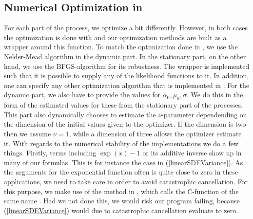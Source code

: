\subsection{Numerical Optimization in }
For each part of the process, we optimize a bit differently. However, in both cases the optimization is done with  \cite{Rlang} and our optimization methods are built as a wrapper around this function. To match the optimization done in \cite{Ditlevsen2023}, we use the Nelder-Mead algorithm in the dynamic part. In the stationary part, on the other hand, we use the BFGS-algorithm for its robustness. The wrapper is implemented such that it is possible to supply any of the likelihood functions to it. In addition, one can specify any other optimization algorithm that is implemented in . For the dynamic part, we also have to provide the values for $\alpha_0, \mu_0, \sigma$. We do this in the form of the estimated values for these from the stationary part of the processes. This part also dynamically chooses to estimate the $\nu$-parameter dependending on the dimension of the initial values given to the optimizer. If the dimension is two then we assume $\nu = 1$, while a dimension of three allows the optimizer estimate it. With regards to the numerical stability of the implementations we do a few things. Firstly, terms including $\exp\left(x\right) - 1$ or its additive inverse show up in many of our formulas. This is for instance the case in (\ref{linearSDEVariance}). As the arguments for the exponential function often is quite close to zero in these applications, we need to take care in order to avoid catastrophic cancellation. For this purpose, we make use of the  method in , which calls the C-function of the same name \cite{cppreference_expm1}. Had we not done this, we would risk our program failing, because (\ref{linearSDEVariance}) would due to catastrophic cancellation evaluate to zero.
